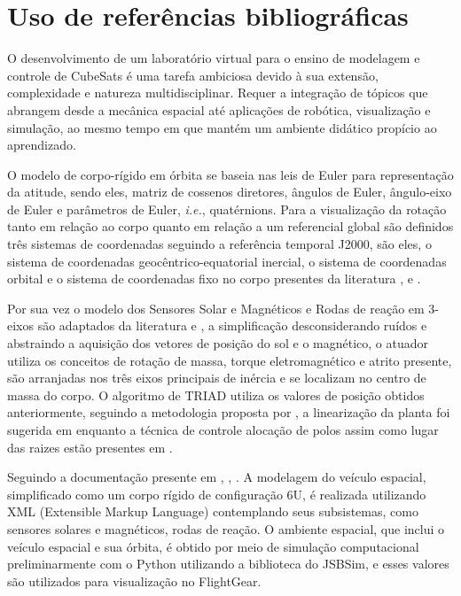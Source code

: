 
\chapter{Uso de referências bibliográficas}
O desenvolvimento de um laboratório virtual para o ensino de modelagem e controle de CubeSats é uma tarefa ambiciosa devido à sua extensão, complexidade e natureza multidisciplinar. Requer a integração de tópicos que abrangem desde a mecânica espacial até aplicações de robótica, visualização e simulação, ao mesmo tempo em que mantém um ambiente didático propício ao aprendizado.

O modelo de corpo-rígido em órbita se baseia nas leis de Euler para representação da atitude, sendo eles, matriz de cossenos diretores, ângulos de Euler, ângulo-eixo de Euler e parâmetros de Euler, \textit{i.e.}, quatérnions. Para a visualização da rotação tanto em relação ao corpo quanto em relação a um referencial global são definidos três sistemas de coordenadas seguindo a referência temporal J2000, são eles, o sistema de coordenadas geocêntrico-equatorial inercial, o sistema de coordenadas orbital e o sistema de coordenadas fixo no corpo presentes da literatura ,  e . 

Por sua vez o modelo dos Sensores Solar e Magnéticos e Rodas de reação em 3-eixos são adaptados da literatura  e \cite{baroni2020attitude},  a simplificação desconsiderando ruídos e abstraindo a aquisição dos vetores de posição do sol e o magnético, o atuador utiliza os conceitos de rotação de massa, torque eletromagnético e atrito presente, são arranjadas nos três eixos principais de inércia e se localizam no centro de massa do corpo. O algoritmo de TRIAD utiliza os valores de posição obtidos anteriormente, seguindo a metodologia proposta por , a linearização da planta foi sugerida em  enquanto a técnica de controle alocação de polos assim como lugar das raizes estão presentes em .

Seguindo a documentação presente em \citeonline, , . A modelagem do veículo espacial, simplificado como um corpo rígido de configuração 6U, é realizada utilizando XML (Extensible Markup Language) contemplando seus subsistemas, como sensores solares e magnéticos, rodas de reação. O ambiente espacial, que inclui o veículo espacial e sua órbita, é obtido por meio de simulação computacional preliminarmente com o Python utilizando a biblioteca do JSBSim, e esses valores são utilizados para visualização no FlightGear. 



